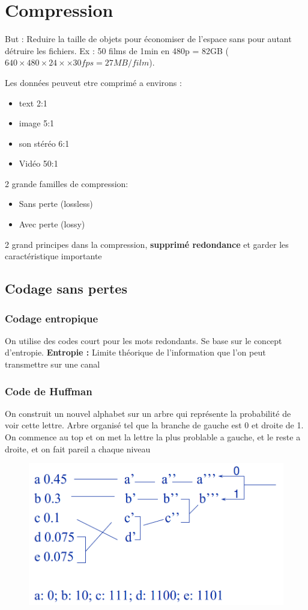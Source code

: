 \section{Compression}
	But : Reduire la taille de objets pour économiser de l'espace sans pour autant détruire les fichiers. Ex : 50 films de 1min en 480p = 82GB ($640 \times 480 \times 24 \times \times 30fps = 27MB/film$).

	Les données peuveut etre comprimé a environs :
	\begin{itemize}
		\item text 2:1
		\item image 5:1
		\item son stéréo 6:1
		\item Vidéo 50:1
	\end{itemize}
	
	2 grande familles de compression:
	\begin{itemize}
		\item Sans perte (lossless)
		\item Avec perte (lossy)
	\end{itemize}

	2 grand principes dans la compression, \textbf{supprimé redondance} et garder les caractéristique importante
	
	\subsection{Codage sans pertes}
		\subsubsection{Codage entropique}
			On utilise des codes court pour les mots redondants. Se base sur le concept d'entropie. \textbf{Entropie :} Limite théorique de l'information que l'on peut transmettre sur une canal
			
		\subsubsection{Code de Huffman}
			On construit un nouvel alphabet sur un arbre qui représente la probabilité de voir cette lettre. Arbre organisé tel que la branche de gauche est 0 et droite de 1. On commence au top et on met la lettre la plus problable a gauche, et le reste a droite, et on fait pareil a chaque niveau
			
			\begin{figure}[H]
				\centering
				\includegraphics[width=.5\textwidth]{img/Compression/Huffman.png}
			\end{figure}
			
